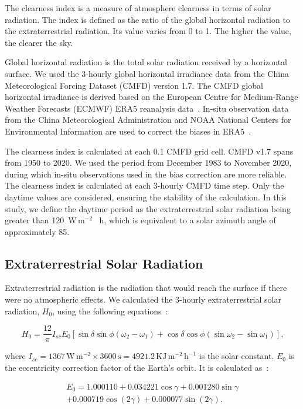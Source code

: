 \documentclass[atmosphere,article,accept,pdftex,moreauthors]{Definitions/mdpi}
\begin{document}
The clearness index is a measure of atmosphere clearness in terms of solar radiation. The index is defined as the ratio of the global horizontal radiation to the extraterrestrial radiation. Its value varies from 0 to 1. The higher the value, the clearer the sky.

Global horizontal radiation is the total solar radiation received by a horizontal surface. We used the 3-hourly global horizontal irradiance data from the China Meteorological Forcing Dataset (CMFD) version 1.7. The CMFD global horizontal irradiance is derived based on the European Centre for Medium-Range Weather Forecasts (ECMWF) ERA5 reanalysis data~\cite{hersbach2020QJRMS}. In-situ observation data from the China Meteorological Administration and NOAA National Centers for Environmental Information are used to correct the biases in ERA5~\cite{he2020SD}.

The clearness index is calculated at each 0.1\textdegree{} CMFD grid cell. CMFD v1.7 spans from 1950 to 2020. We used the period from December 1983 to November 2020, during which in-situ observations used in the bias correction are more reliable. The clearness index is calculated at each 3-hourly CMFD time step. Only the daytime values are considered, ensuring the stability of the calculation. In this study, we define the daytime period as the extraterrestrial solar radiation being greater than 120~\(\mathrm{W\,m^{-2}}\) ~h, which is equivalent to a solar azimuth angle of approximately 85\textdegree{}.

\subsection{Extraterrestrial Solar Radiation}\label{sec:extraterrestrial}

Extraterrestrial radiation is the radiation that would reach the surface if there were no atmospheric effects. We calculated the 3-hourly extraterrestrial solar radiation, \(H_0\), using the following equations~\cite{udo2000SE}:
\begin{linenomath}
  \begin{equation}\label{eq:esr}
    H_0 = \frac{12}{\pi} I_{sc} E_0 \left[\sin\delta \sin\phi(\omega_2 - \omega_1) + \cos\delta \cos\phi(\sin\omega_2-\sin\omega_1)\right] \text{,}
  \end{equation}
\end{linenomath}
where \(I_{sc} = 1367\,\mathrm{W\,m^{-2}}\times{}3600\,\mathrm{s} = 4921.2\,\mathrm{KJ\,m^{-2}\,h^{-1}}\) is the solar constant. \(E_0\) is the eccentricity correction factor of the Earth's orbit. It is calculated as~\cite{udo2000SE}:
\begin{linenomath}
  \begin{multline}\label{eq:eccentricity}
    E_0 = 1.000110
    + 0.034221\cos\gamma
    + 0.001280\sin\gamma \\
    + 0.000719\cos(2\gamma)
    + 0.000077\sin(2\gamma) \text{.}
  \end{multline}
\end{linenomath}
\end{document}
